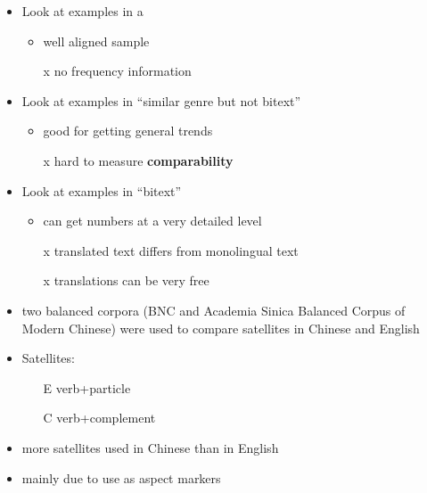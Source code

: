 \documentclass[a4paper,landscape,headrule,footrule,dvips]{foils}
\begin{document}
\begin{CJK}{UTF8}{min}

\begin{itemize}
\item Look at examples in a 
  \begin{itemize}
  \item well aligned sample
  \item[x] no frequency information
  \end{itemize}
\item Look at examples in   ``similar genre but not bitext''
  \begin{itemize}
  \item good for getting general trends
  \item[x] hard to measure \textbf{comparability}
  \end{itemize}
\item Look at examples in   ``bitext''
  \begin{itemize}
  \item can get numbers at a very detailed level
  \item[x] translated text differs from monolingual text
  \item[x] translations can be very free
  \end{itemize}
\end{itemize}





\begin{itemize}
\item two balanced corpora (BNC and Academia Sinica Balanced Corpus of Modern
Chinese) were used to compare satellites in Chinese and English

\item Satellites:
  \begin{itemize}
  \item[E]  verb+particle 
  \item[C]  verb+complement 
  \end{itemize}
\item more satellites used in Chinese than in English
\item mainly due to use as aspect markers
\end{itemize}


\end{CJK}
\end{document}
